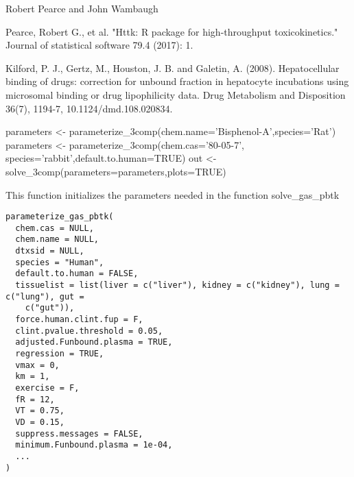 \documentclass[a4paper]{book}
\begin{document}
%
\begin{Author}\relax
Robert Pearce and John Wambaugh
\end{Author}
%
\begin{References}\relax
Pearce, Robert G., et al. "Httk: R package for high-throughput 
toxicokinetics." Journal of statistical software 79.4 (2017): 1.

Kilford, P. J., Gertz, M., Houston, J. B. and Galetin, A.
(2008). Hepatocellular binding of drugs: correction for unbound fraction in
hepatocyte incubations using microsomal binding or drug lipophilicity data.
Drug Metabolism and Disposition 36(7), 1194-7, 10.1124/dmd.108.020834.
\end{References}
%
\begin{Examples}
\begin{ExampleCode}

 parameters <- parameterize_3comp(chem.name='Bisphenol-A',species='Rat')
 parameters <- parameterize_3comp(chem.cas='80-05-7',
                                  species='rabbit',default.to.human=TRUE)
 out <- solve_3comp(parameters=parameters,plots=TRUE)

\end{ExampleCode}
\end{Examples}
%
\begin{Description}\relax
This function initializes the parameters needed in the function solve\_gas\_pbtk
\end{Description}
%
\begin{Usage}
\begin{verbatim}
parameterize_gas_pbtk(
  chem.cas = NULL,
  chem.name = NULL,
  dtxsid = NULL,
  species = "Human",
  default.to.human = FALSE,
  tissuelist = list(liver = c("liver"), kidney = c("kidney"), lung = c("lung"), gut =
    c("gut")),
  force.human.clint.fup = F,
  clint.pvalue.threshold = 0.05,
  adjusted.Funbound.plasma = TRUE,
  regression = TRUE,
  vmax = 0,
  km = 1,
  exercise = F,
  fR = 12,
  VT = 0.75,
  VD = 0.15,
  suppress.messages = FALSE,
  minimum.Funbound.plasma = 1e-04,
  ...
)
\end{verbatim}
\end{Usage}
%
\end{document}
